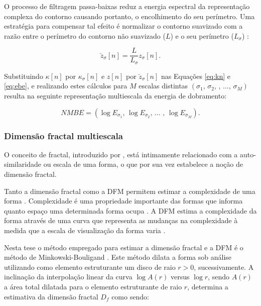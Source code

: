 O processo de filtragem passa-baixas reduz a energia espectral da representação complexa do contorno causando portanto, o encolhimento do seu perímetro. Uma estratégia para compensar tal efeito é normalizar o contorno suavizado com a razão entre o perímetro do contorno não suavizado ($L$) e o seu perímetro ($L_{\sigma}$) \cite{Cesar:1996,Costa:1997}:

\begin{equation}
\breve{z}_{\sigma}[n] = \frac{L}{L_{\sigma}}z_{\sigma}[n]\text{.}
\end{equation}

Substituindo $\kappa[n]$ por $\kappa_{\sigma}[n]$ e $z[n]$ por $\breve{z}_{\sigma}[n]$ nas Equações \ref{eq:kn} e \ref{eq:ebe}, e realizando estes cálculos para $M$ escalas distintas $(\sigma_1\text{, }\sigma_2\text{, }\text{, }\ldots\text{, }\sigma_M)$ resulta na seguinte representação multiescala da energia de dobramento:

\begin{equation}
NMBE = (\log{E_{\sigma_{1}}}\text{, }\log{E_{\sigma_{2}}}\text{, }\ldots \text{ , }\log{E_{\sigma_{M}}})\text{.}
\label{eq:nmbe}
\end{equation}
 
\subsubsection*{Dimensão fractal multiescala}

O conceito de fractal, introduzido por , está intimamente relacionado com a auto-similaridade ou escala de uma forma, o que por sua vez estabelece a noção de dimensão fractal.

Tanto a dimensão fractal como a \ac{DFM} permitem estimar a complexidade de uma forma \cite{Backes:2012}. Complexidade é uma propriedade importante das formas que informa quanto espaço uma determinada forma ocupa \cite{Costa:2009}. A \ac{DFM} estima a complexidade da forma através de uma curva que representa as mudanças na complexidade à medida que a escala de visualização da forma varia \cite{Florindo:2012}.

Nesta tese o método empregado para estimar a dimensão fractal e a \acl{DFM} é o método de Minkowski-Bouligand \cite{Costa:2009}. Este método dilata a forma sob análise utilizando como elemento estruturante um disco de raio $r > 0$, sucessivamente. A inclinação da interpolação linear da curva $\log{A(r)}$ versus $\log{r}$, sendo $A(r)$ a área total dilatada para o elemento estruturante de raio $r$, determina a estimativa da dimensão fractal $D_f$ como sendo:

